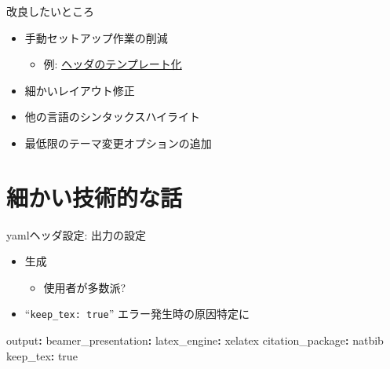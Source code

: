 \documentclass[
  14pt,
  ignorenonframetext,
]{beamer}
\newenvironment{Shaded}{\begin{snugshade}}{\end{snugshade}}
\newcommand{\AttributeTok}[1]{\textcolor[rgb]{0.77,0.63,0.00}{#1}}
\newcommand{\CharTok}[1]{\textcolor[rgb]{0.31,0.60,0.02}{#1}}
\newcommand{\FunctionTok}[1]{\textcolor[rgb]{0.00,0.00,0.00}{#1}}
\newcommand{\KeywordTok}[1]{\textcolor[rgb]{0.13,0.29,0.53}{\textbf{#1}}}
\providecommand{\tightlist}{%
  \setlength{\itemsep}{0pt}\setlength{\parskip}{0pt}}
\begin{document}
\begin{frame}{改良したいところ}
\protect\hypertarget{ux6539ux826fux3057ux305fux3044ux3068ux3053ux308d}{}

\begin{itemize}
\tightlist
\item
  手動セットアップ作業の削減

  \begin{itemize}
  \tightlist
  \item
    例:
    \href{https://atusy.github.io/tokyor85-original-rmd-format}{ヘッダのテンプレート化}
  \end{itemize}
\item
  細かいレイアウト修正
\item
  他の言語のシンタックスハイライト
\item
  最低限のテーマ変更オプションの追加
\end{itemize}

\end{frame}

\hypertarget{ux7d30ux304bux3044ux6280ux8853ux7684ux306aux8a71}{%
\section{細かい技術的な話}\label{ux7d30ux304bux3044ux6280ux8853ux7684ux306aux8a71}}

\begin{frame}[fragile]{yamlヘッダ設定: 出力の設定}
\protect\hypertarget{yamlux30d8ux30c3ux30c0ux8a2dux5b9a-ux51faux529bux306eux8a2dux5b9a}{}

\begin{itemize}
\tightlist
\item
  \XeLaTeX 生成

  \begin{itemize}
  \tightlist
  \item
    \LuaLaTeX 使用者が多数派?
  \end{itemize}
\item
  ``\texttt{keep\_tex:\ true}'' エラー発生時の原因特定に
\end{itemize}

\begin{Shaded}
\begin{Highlighting}[]
\FunctionTok{output}\KeywordTok{:}
\AttributeTok{  }\FunctionTok{beamer_presentation}\KeywordTok{:}
\AttributeTok{    }\FunctionTok{latex_engine}\KeywordTok{:}\AttributeTok{ xelatex}
\AttributeTok{    }\FunctionTok{citation_package}\KeywordTok{:}\AttributeTok{ natbib}
\AttributeTok{    }\FunctionTok{keep_tex}\KeywordTok{:}\AttributeTok{ }\CharTok{true}
\end{Highlighting}
\end{Shaded}

\end{frame}
\end{document}
